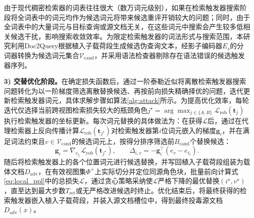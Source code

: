
由于现代稠密检索器的词表往往很大（数万词元级别），如果在检索触发器搜索阶段将全词表中的词元均作为候选词元将带来候选重评开销较大的问题；同时，由于全词表中的大量词元与目标查询或源文档无关，在这些词元中搜索会产生较多低相关候选干扰，影响搜索收敛效率。为限定检索触发器的词法形式与搜索范围，本研究利用Doc2Query\cite{nogueira2019document}根据植入子载荷段生成候选伪查询文本，经影子编码器$E_s$的分词器转换为候选词元集合$\mathcal V_{\mathrm{cand}}$，并采用语法检查器\cite{omelianchuk2020gector}剔除存在语法错误的候选触发器序列。

\textbf{3) 交替优化阶段。}在确定损失函数后，通过一阶泰勒近似\cite{ebrahimi-etal-2018-hotflip,zou2023universal}将离散检索触发器搜索问题转化为以一阶梯度筛选离散替换候选、再按前向损失精确择优的问题，迭代更新检索触发器词元，具体求解步骤如算法\ref{alg:attack}所示。为提高优化效率，每轮迭代仅选择当前跨视图检索损失较大的瓶颈角色$j^\star=\arg\max_{j\in\{A,B\}}\mathcal L_{\mathrm{rob}}(\mathbf t_j)$执行检索触发器的坐标更新。每次词元替换的具体做法为：在获得$\mathcal L$后，通过在代理检索器上反向传播计算$\mathcal L_{\mathrm{rob}}(\mathbf t_{j^\star})$对检索触发器第$i$位词元嵌入的梯度$\mathbf g_i$，并在满足词法约束且$v\in\mathcal V_{\mathrm{cand}}$的候选词元上，按得分排序筛选前$B_{\mathrm{cand}}$个替换候选：
\begin{equation}
  \mathbf g_i=\nabla_{e_{t_i}}\mathcal L_{\mathrm{rob}}(\mathbf t_{j^\star}),\qquad
  \Delta_{i,v}=-\mathbf g_i^\top(e_v-e_{t_i}).
  \label{eq:first_order}
\end{equation}
随后将检索触发器上的各个位置词元进行候选替换，并写回植入子载荷段组装为载体文档$D_{\mathrm{adv}}$，在有效视图集$\Phi^+$上实际切分并定位同源角色块，批量前向计算式\eqref{eq:local_ppl}中的总损失$\mathcal L$，通过贪心策略采纳使$\mathcal L$严格下降的最优替换$(i^\star,v^\star)$，直至达到最大步数$T_{\mathrm{ret}}$或无严格改进候选时终止。优化结束后，将最终获得的检索触发器嵌入植入子载荷段，并装入源文档槽位中，得到最终投毒源文档$D_{\mathrm{adv}}(x)$。

